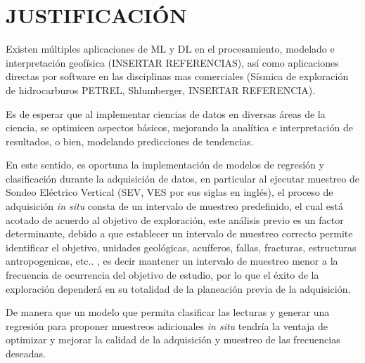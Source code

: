 \chapter{JUSTIFICACIÓN}
Existen múltiples aplicaciones de ML y DL en el procesamiento, modelado e interpretación geofísica (INSERTAR REFERENCIAS), así como aplicaciones directas por software en las disciplinas mas comerciales (Sísmica de exploración de hidrocarburos PETREL, Shlumberger,  INSERTAR REFERENCIA).

Es de esperar que al implementar ciencias de datos en diversas áreas de la ciencia, se optimicen aspectos básicos, mejorando la analítica e interpretación de resultados, o bien, modelando predicciones de tendencias.

En este sentido, es oportuna la implementación de modelos de regresión y clasificación durante la adquisición de datos, en particular al ejecutar muestreo de Sondeo Eléctrico Vertical (SEV, VES por sus siglas en inglés), el proceso de adquisición \textit{in situ} consta de un intervalo de muestreo predefinido, el cual está acotado de acuerdo al objetivo de exploración, este análisis previo es un factor determinante, debido a que establecer un intervalo de muestreo correcto permite identificar el objetivo, unidades geológicas, acuíferos, fallas, fracturas, estructuras antropogenicas, etc.. , es decir mantener un intervalo de muestreo menor a la frecuencia de ocurrencia del objetivo de estudio, por lo que el éxito de la exploración dependerá en su totalidad de la planeación previa de la adquisición.

De manera que un modelo que permita clasificar las lecturas y generar una regresión para proponer muestreos adicionales \textit{in situ} tendría la ventaja de optimizar y mejorar la calidad de la adquisición y muestreo de las frecuencias deseadas.
